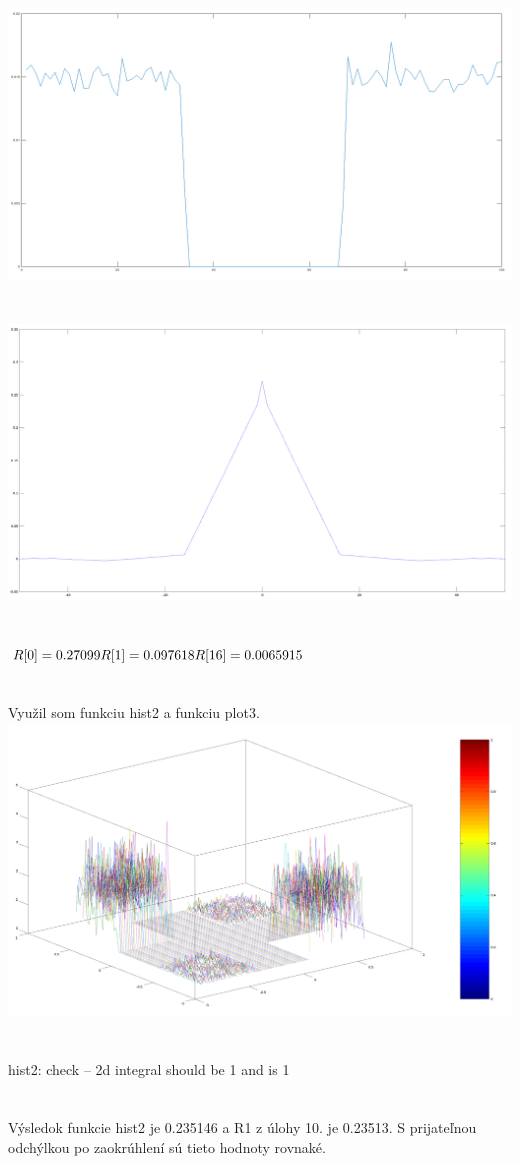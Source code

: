 \documentclass[a4paper,12pt,twocolumn]{article}
\begin{document}
\section{}
\includegraphics[width=\linewidth]{9}
\section{}
\includegraphics[width=\linewidth]{10}
\section{}
$R[0] = 0.27099 \\
R[1] = 0.097618 \\
R[16] = 0.0065915$
\section{}
Využil som funkciu hist2 a funkciu plot3.
\includegraphics[width=\linewidth]{12}
\section{}
hist2: check -- 2d integral should be 1 and is 1
\section{}
Výsledok funkcie hist2 je 0.235146 a R1 z úlohy 10. je 0.23513. S prijateľnou odchýlkou po zaokrúhlení sú tieto hodnoty rovnaké.
\end{document}
